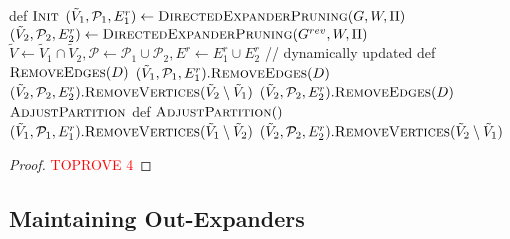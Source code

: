 \documentclass[11pt]{article}
\begin{document}
\begin{algorithm}[H]
    \begin{algorithmic}
    \caption{$\textsc{BiDirectedExpanderPruning}(G, W, \Pi)$}\label{alg:BiDirectedExpanderPruning}
    \State def $\textsc{Init}$
    \Indent
    \State $(\tilde{V}_1, \mathcal{P}_1, E^r_1) \leftarrow \textsc{DirectedExpanderPruning}(G, W, \Pi)$
    \State $(\tilde{V}_2, \mathcal{P}_2, E^r_2) \leftarrow \textsc{DirectedExpanderPruning}(G^{rev}, W, \Pi)$
    \State $\tilde{V} \leftarrow \tilde{V}_1 \cap \tilde{V}_2, \mathcal{P} \leftarrow \mathcal{P}_1 \cup \mathcal{P}_2, E^r \leftarrow E^r_1 \cup E^r_2$ // dynamically updated
    \EndIndent
    \State 
    \State def $\textsc{RemoveEdges}(D)$
    \Indent
    \State $(\tilde{V}_1, \mathcal{P}_1, E^r_1).\textsc{RemoveEdges}(D)$ 
    \State $(\tilde{V}_2, \mathcal{P}_2, E^r_2).\textsc{RemoveVertices}(\tilde{V}_2 \setminus \tilde{V}_1)$
    \State $(\tilde{V}_2, \mathcal{P}_2, E^r_2).\textsc{RemoveEdges}(D)$ 
    \State $\textsc{AdjustPartition}$
    \EndIndent
    \State
    \State def $\textsc{AdjustPartition}()$
    \Indent
    \State $(\tilde{V}_1, \mathcal{P}_1, E^r_1).\textsc{RemoveVertices}(\tilde{V}_1 \setminus \tilde{V}_2)$
    \State $(\tilde{V}_2, \mathcal{P}_2, E^r_2).\textsc{RemoveVertices}(\tilde{V}_2 \setminus \tilde{V}_1)$
    \EndWhile
    \EndIndent
    \end{algorithmic}
    \label{alg:bidirectedExp}
\end{algorithm}

\begin{proof}\textcolor{red}{TOPROVE 4}\end{proof}

\subsection{Maintaining Out-Expanders}
\label{subsec:outExpan}
\end{document}
